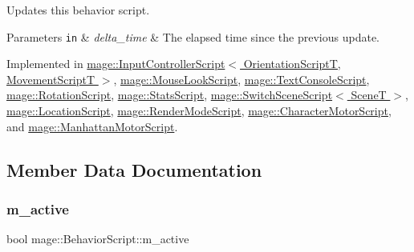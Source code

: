 Updates this behavior script.


\begin{DoxyParams}[1]{Parameters}
\mbox{\tt in}  & {\em delta\+\_\+time} & The elapsed time since the previous update. \\
\hline
\end{DoxyParams}


Implemented in \hyperlink{classmage_1_1_input_controller_script_a2b91f7c131dee5d09ac38e2878a715e3}{mage\+::\+Input\+Controller\+Script$<$ Orientation\+Script\+T, Movement\+Script\+T $>$}, \hyperlink{classmage_1_1_mouse_look_script_a7962403a78c02b2fe64e8f06f6319312}{mage\+::\+Mouse\+Look\+Script}, \hyperlink{classmage_1_1_text_console_script_a7b1acbf48376b650c08fa941a63ffa98}{mage\+::\+Text\+Console\+Script}, \hyperlink{classmage_1_1_rotation_script_a96936107b1b955cce5e84b8081f930bb}{mage\+::\+Rotation\+Script}, \hyperlink{classmage_1_1_stats_script_abb2f4de15b51b72e54dc893ecd947fad}{mage\+::\+Stats\+Script}, \hyperlink{classmage_1_1_switch_scene_script_a8faac4e2f6f571f13aecf488057f7dfb}{mage\+::\+Switch\+Scene\+Script$<$ Scene\+T $>$}, \hyperlink{classmage_1_1_location_script_a3ffe0474c573e2cf858aee62056324a3}{mage\+::\+Location\+Script}, \hyperlink{classmage_1_1_render_mode_script_a13d76eb4e8362cb519cc3cf98102094f}{mage\+::\+Render\+Mode\+Script}, \hyperlink{classmage_1_1_character_motor_script_af09581e810c02ca4a19ecbaf0d7580bb}{mage\+::\+Character\+Motor\+Script}, and \hyperlink{classmage_1_1_manhattan_motor_script_aa2aee651ef777e71ac8da8345f86b212}{mage\+::\+Manhattan\+Motor\+Script}.



\subsection{Member Data Documentation}
\hypertarget{classmage_1_1_behavior_script_a18f81792aed31a2d61a8a75784e2ceef}{}\label{classmage_1_1_behavior_script_a18f81792aed31a2d61a8a75784e2ceef} 
\subsubsection{\texorpdfstring{m\+\_\+active}{m\_active}}
{\footnotesize\ttfamily bool mage\+::\+Behavior\+Script\+::m\+\_\+active\hspace{0.3cm}{\ttfamily [private]}}

